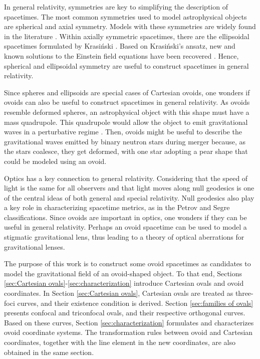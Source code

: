 \documentclass[12pt, ams, nofootinbib]{revtex4}
\theoremstyle{definition}
\begin{document}
In general relativity, symmetries are key to simplifying the description of spacetimes. The most common symmetries used to model astrophysical objects are spherical and axial symmetry. Models with these symmetries are widely found in the literature \cite{schwarzschild1916fluid,tolman1939static,wahlquist1968interior,chinea1990interior}. Within axially symmetric spacetimes, there are the ellipsoidal spacetimes formulated by Krasiński \cite{Krasinski1978}. Based on Krasiński's ansatz, new and known solutions to the Einstein field equations have been recovered \cite{Racz1992,racz1998uniqueness, Zsigrai2003}. Hence, spherical and ellipsoidal symmetry are useful to construct spacetimes in general relativity.

Since spheres and ellipsoids are special cases of Cartesian ovoids, one wonders if ovoids can also be useful to construct spacetimes in general relativity. As ovoids resemble deformed spheres, an astrophysical object with this shape must have a mass quadrupole. This quadrupole would allow the object to emit gravitational waves in a perturbative regime \cite{misner2017gravitation}. Then, ovoids might be useful to describe the gravitational waves emitted by binary neutron stars during merger because, as the stars coalesce, they get deformed, with one star adopting a pear shape that could be modeled using an ovoid.

Optics has a key connection to general relativity. Considering that the speed of light is the same for all observers and that light moves along null geodesics is one of the central ideas of both general and special relativity. Null geodesics also play a key role in characterizing spacetime metrics, as in the Petrov and Segre classifications. Since ovoids are important in optics, one wonders if they can be useful in general relativity. Perhaps an ovoid spacetime can be used to model a stigmatic gravitational lens, thus leading to a theory of optical aberrations for gravitational lenses.

The purpose of this work is to construct some ovoid spacetimes as candidates to model the gravitational field of an ovoid-shaped object. To that end, Sections \ref{sec:Cartesian ovals}-\ref{sec:characterization} introduce Cartesian ovals and ovoid coordinates. In Section \ref{sec:Cartesian ovals}, Cartesian ovals are treated as three-foci curves, and their existence condition is derived. Section \ref{sec:families of ovals} presents confocal and triconfocal ovals, and their respective orthogonal curves. Based on these curves, Section \ref{sec:characterization} formulates and characterizes ovoid coordinate systems. The transformation rules between ovoid and Cartesian coordinates, together with the line element in the new coordinates, are also obtained in the same section.
\end{document}
